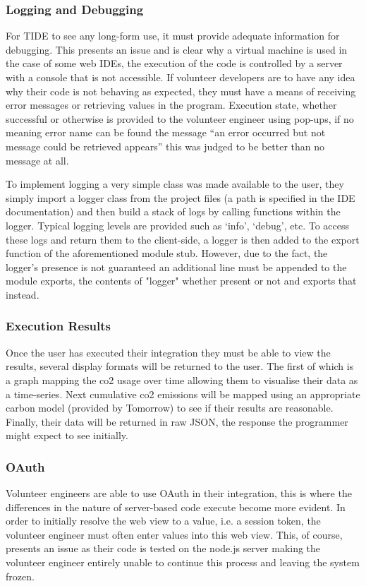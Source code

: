 \documentclass[jou,apacite]{apa6}
\begin{document}
\subsubsection{Logging and Debugging}
For TIDE to see any long-form use, it must provide adequate information for debugging. This presents an issue and is clear why a virtual machine is used in the case of some web IDEs, the execution of the code is controlled by a server with a console that is not accessible. If volunteer developers are to have any idea why their code is not behaving as expected, they must have a means of receiving error messages or retrieving values in the program. Execution state, whether successful or otherwise is provided to the volunteer engineer using pop-ups, if no meaning error name can be found the message “an error occurred but not message could be retrieved appears” this was judged to be better than no message at all.

To implement logging a very simple class was made available to the user, they simply import a logger class from the project files (a path is specified in the IDE documentation) and then build a stack of logs by calling functions within the logger. Typical logging levels are provided such as ‘info’, ‘debug’, etc. To access these logs and return them to the client-side, a logger is then added to the export function of the aforementioned module stub. However, due to the fact, the logger's presence is not guaranteed an additional line must be appended to the module exports, the contents of "logger" whether present or not and exports that instead.

\subsubsection{Execution Results}
Once the user has executed their integration they must be able to view the results, several display formats will be returned to the user. The first of which is a graph mapping the co2 usage over time allowing them to visualise their data as a time-series. Next cumulative co2 emissions will be mapped using an appropriate carbon model (provided by Tomorrow) to see if their results are reasonable. Finally, their data will be returned in raw JSON, the response the programmer might expect to see initially. 

\subsubsection{OAuth}
Volunteer engineers are able to use OAuth in their integration, this is where the differences in the nature of server-based code execute become more evident. In order to initially resolve the web view to a value, i.e. a session token, the volunteer engineer must often enter values into this web view. This, of course, presents an issue as their code is tested on the node.js server making the volunteer engineer entirely unable to continue this process and leaving the system frozen. 
\end{document}
